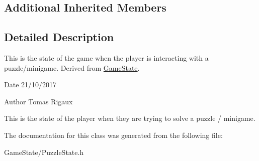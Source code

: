 \subsection*{Additional Inherited Members}


\subsection{Detailed Description}
This is the state of the game when the player is interacting with a puzzle/minigame. Derived from \hyperlink{classGameState}{Game\-State}. 

\begin{DoxyDate}{Date}
21/10/2017 
\end{DoxyDate}
\begin{DoxyAuthor}{Author}
Tomas Rigaux
\end{DoxyAuthor}
This is the state of the player when they are trying to solve a puzzle / minigame. 

The documentation for this class was generated from the following file\-:\begin{DoxyCompactItemize}
\item 
Game\-State/Puzzle\-State.\-h\end{DoxyCompactItemize}
